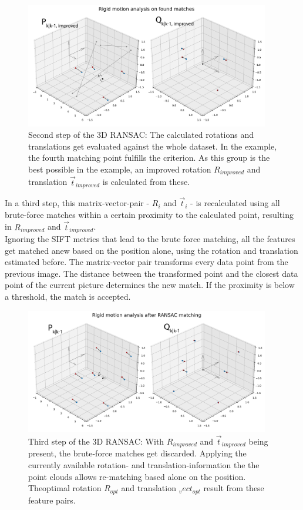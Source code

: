 \begin{figure}[H]
    \centering
    \includegraphics[width=0.95\textwidth]{images/ransac_3d_step2.pdf}
    \caption{Second step of the 3D RANSAC: The calculated rotations and translations get evaluated against the whole dataset. In the example, the fourth matching point fulfills the criterion. As this group is the best possible in the example, an improved rotation $R_{improved}$ and translation $\vec{t}_{improved}$ is calculated from these.}
    \label{im:ransac2}
\end{figure}
 In a third step, this matrix-vector-pair - $R_{i}$ and $\vec{t}_{i}$ - is recalculated using all brute-force matches within a certain proximity to the calculated point, resulting in $R_{improved}$ and $\vec{t}_{improved}$.\\
Ignoring the SIFT metrics that lead to the brute force matching, all the features get matched anew based on the position alone, using the rotation and translation estimated before. The matrix-vector pair transforms every data point from the previous image. The distance between the transformed point and the closest data point of the current picture determines the new match. If the proximity is below a threshold, the match is accepted.
\begin{figure}[H]
    \centering
    \includegraphics[width=0.95\textwidth]{images/ransac_3d_step3.pdf}
    \caption{Third step of the 3D RANSAC: With $R_{improved}$ and $\vec{t}_{improved}$ being present, the brute-force matches get discarded. Applying the currently available rotation- and translation-information the the point clouds allows re-matching based alone on the position. Theoptimal rotation $R_{opt}$ and translation $_vec{t}_{opt}$ result from these feature pairs.}
    \label{im:ransac3}
\end{figure}

